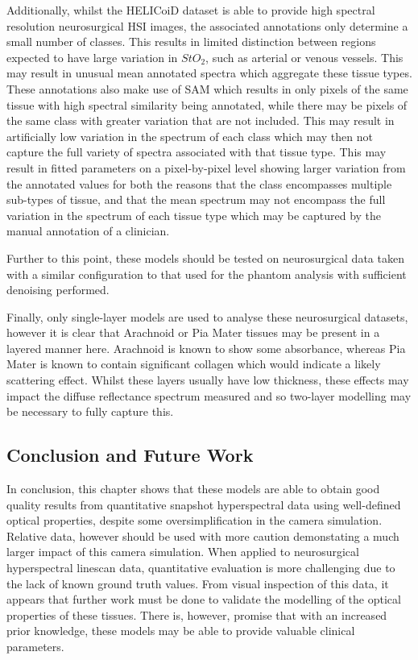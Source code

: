 Additionally, whilst the HELICoiD dataset is able to provide high spectral resolution neurosurgical HSI images, the associated annotations only determine a small number of classes. This results in limited distinction between regions expected to have large variation in $StO_2$, such as arterial or venous vessels. This may result in unusual mean annotated spectra which aggregate these tissue types. These annotations also make use of SAM which results in only pixels of the same tissue with high spectral similarity being annotated, while there may be pixels of the same class with greater variation that are not included. This may result in artificially low variation in the spectrum of each class which may then not capture the full variety of spectra associated with that tissue type. This may result in fitted parameters on a pixel-by-pixel level showing larger variation from the annotated values for both the reasons that the class encompasses multiple sub-types of tissue, and that the mean spectrum may not encompass the full variation in the spectrum of each tissue type which may be captured by the manual annotation of a clinician. %

Further to this point, these models should be tested on neurosurgical data taken with a similar configuration to that used for the phantom analysis with sufficient denoising performed. 

Finally, only single-layer models are used to analyse these neurosurgical datasets, however it is clear that Arachnoid or Pia Mater tissues may be present in a layered manner here. Arachnoid is known to show some absorbance, whereas Pia Mater is known to contain significant collagen which would indicate a likely scattering effect\cite{Ghannam2023}. Whilst these layers usually have low thickness\cite{Ghannam2023}, these effects may impact the diffuse reflectance spectrum measured and so two-layer modelling may be necessary to fully capture this. 

\subsection{Conclusion and Future Work}
In conclusion, this chapter shows that these models are able to obtain good quality results from quantitative snapshot hyperspectral data using well-defined optical properties, despite some oversimplification in the camera simulation. Relative data, however should be used with more caution demonstating a much larger impact of this camera simulation. When applied to neurosurgical hyperspectral linescan data, quantitative evaluation is more challenging due to the lack of known ground truth values. From visual inspection of this data, it appears that further work must be done to validate the modelling of the optical properties of these tissues. There is, however, promise that with an increased prior knowledge, these models may be able to provide valuable clinical parameters. 

